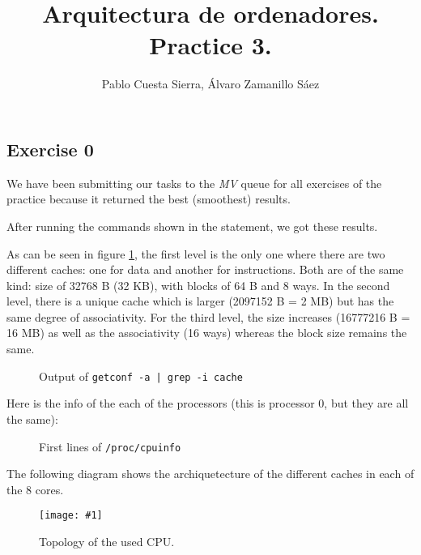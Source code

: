 \documentclass{article}
\newcommand{\myFigure}[4]{%
    \begin{figure}[!ht]
        \texttt{[image: \#1]}
        \centering
        \caption{#2}
        \label{#3}
    \end{figure}
}
\begin{document}
\title{Arquitectura de ordenadores. Practice 3.}
\author{Pablo Cuesta Sierra, Álvaro Zamanillo Sáez}
\maketitle


\subsection*{Exercise 0}

We have been submitting our tasks to the \emph{MV} queue for all exercises of the practice because it returned the best (smoothest) results. 

After running the commands shown in the statement, we got these results. 

As can be seen in figure \ref{cache_conf}, the first level is the only one where there are two different caches: one for data and another for instructions. Both are of the same kind: size of 32768 B (32 KB), with blocks of 64 B and 8 ways. 
In the second level, there is a unique cache which is larger (2097152 B = 2 MB) but has the same degree of associativity. For the third level, the size increases (16777216 B = 16 MB) as well as the associativity (16 ways) whereas the block size remains the same.

\begin{figure}[h]
    
    \centering
    \caption{Output of \texttt{getconf -a | grep -i cache}}
    \label{cache_conf}
\end{figure}

\pagebreak

Here is the info of the each of the processors (this is processor 0, but they are all the same):

\begin{figure}[h]
    
    \centering
    \caption{First lines of \texttt{/proc/cpuinfo}}
    \label{cpuinfo}
\end{figure}

The following diagram shows the archiquetecture of the different caches in each of the 8 cores. 

\myFigure{../material_P3/out0/mv/figure.png}{Topology of the used CPU.}{topology}{0.34}
\end{document}

